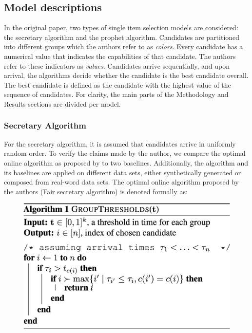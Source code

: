 \subsection{Model descriptions}
In the original paper, two types of single item selection models are considered: the secretary algorithm and the prophet algorithm. Candidates are partitioned into different groups which the authors refer to as \textit{colors}. Every candidate has a numerical value that indicates the capabilities of that candidate. The authors refer to these indicators as \textit{values}. Candidates arrive sequentially, and upon arrival, the algorithms decide whether the candidate is the best candidate overall. The best candidate is defined as the candidate with the highest value of the sequence of candidates. For clarity, the main parts of the Methodology and Results sections are divided per model.

\subsubsection{Secretary Algorithm}
For the secretary algorithm, it is assumed that candidates arrive in uniformly random order. To verify the claims made by the author, we compare the optimal online algorithm as proposed by \citep{correa2021fairness} to two baselines. Additionally, the algorithm and its baselines are applied on different data sets, either synthetically generated or composed from real-word data sets. The optimal online algorithm proposed by the authors (Fair secretary algorithm) is denoted formally as:
\begin{figure}[H]
    \centering
    \includegraphics[width=0.5\linewidth]{media/algosa.png}
    \label{fig:algosa}
\end{figure}

